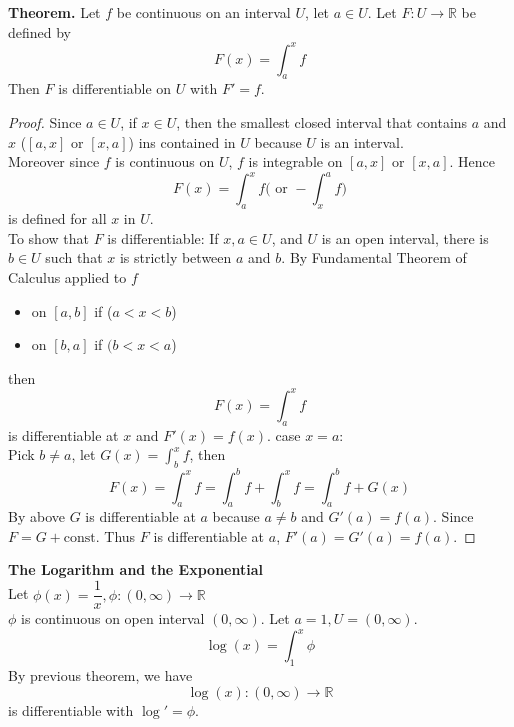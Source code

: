 \documentclass[10pt,letterpaper]{article}
\begin{document}
	
	\textbf{Theorem. } Let $f$ be continuous on an interval $U$, let $a \in U$. Let
	$F: U \rightarrow \mathbb{R}$ be defined by 
	$$F(x) = \displaystyle\int_{a}^{x} f$$
	Then $F$ is differentiable on $U$ with $F' = f$. 
	\begin{proof} Since $a \in U$, if $x \in U$, then the smallest closed interval that 
	contains $a$ and $x$ ($[a, x]$ or $[x, a]$) ins contained in $U$ because $U$ is an interval. \\
	Moreover since $f$ is continuous on $U$, $f$ is integrable on $[a, x]$ or $[x, a]$. Hence
	$$F(x) = \displaystyle\int_{a}^{x} f \bigg( \text{ or } - \displaystyle\int_{x}^{a} f \bigg)$$ 
	is defined for all $x$ in $U$. \\
	To show that $F$ is differentiable: If $x, a \in U$, and $U$ is an open interval, there 
	is $b \in U$ such that $x$ is strictly between $a$ and $b$.
	By Fundamental Theorem of Calculus applied to $f$ 
	\begin{itemize}
		\item on $[a, b]$ if ($a < x < b$)  
		\item on $[b, a]$ if $(b < x < a$)
	\end{itemize}	
	then 
	$$F(x) = \displaystyle\int_{a}^{x} f$$
	is differentiable at $x$ and $F'(x) = f(x)$.
	case $x = a$:\\
		Pick $b \neq a$, let $G(x) = \displaystyle\int_{b}^{x} f$, then
		$$F(x) = \displaystyle\int_{a}^{x} f = 
		\displaystyle\int_{a}^{b} f + \displaystyle\int_{b}^{x} f =
		\displaystyle\int_{a}^{b} f + G(x)$$
	By above $G$ is differentiable at $a$ because $a \neq b$
	and $G'(a) = f(a)$. Since $F = G + \text{const}$. Thus
	$F$ is differentiable at $a$, $F'(a) = G'(a) = f(a)$.
	\end{proof}
		
	{\color{purple}\textbf{The Logarithm and the Exponential}} \\
	Let $\phi(x) = \dfrac{1}{x}, \phi: (0, \infty) \rightarrow \mathbb{R}$ \\
	$\phi$ is continuous on open interval $(0, \infty)$. Let $a = 1, U = (0, \infty)$.
	$$\log(x) = \displaystyle\int_{1}^{x} \phi$$
	By previous theorem, we have 
	$$\log(x) : (0, \infty) \rightarrow \mathbb{R}$$
	is differentiable with $\log' = \phi$. \\
	
\end{document}

